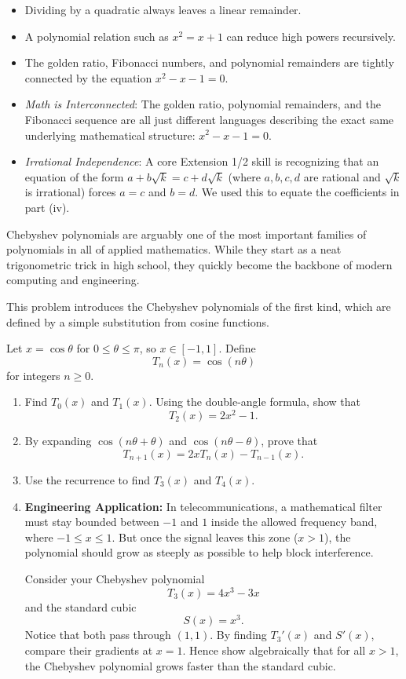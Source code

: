 \begin{takeaways}
\begin{itemize}[leftmargin=*]
\item Dividing by a quadratic always leaves a linear remainder.
\item A polynomial relation such as $x^2=x+1$ can reduce high powers recursively.
\item The golden ratio, Fibonacci numbers, and polynomial remainders are tightly connected by the equation $x^2-x-1=0$.
\item \textit{Math is Interconnected}: The golden ratio, polynomial remainders, and the Fibonacci sequence are all just different languages describing the exact same underlying mathematical structure: $x^2 - x - 1 = 0$.
\item \textit{Irrational Independence}: A core Extension 1/2 skill is recognizing that an equation of the form $a + b\sqrt{k} = c + d\sqrt{k}$ (where $a,b,c,d$ are rational and $\sqrt{k}$ is irrational) forces $a=c$ and $b=d$. We used this to equate the coefficients in part (iv).
\end{itemize}
\end{takeaways}

\begin{problem}

Chebyshev polynomials are arguably one of the most important families of polynomials in all of applied mathematics. While they start as a neat trigonometric trick in high school, they quickly become the backbone of modern computing and engineering.


This problem introduces the Chebyshev polynomials of the first kind, which are defined by a simple substitution from cosine functions.


Let $x=\cos\theta$ for $0\le \theta\le \pi$, so $x\in[-1,1]$. Define
\[
T_n(x)=\cos(n\theta)
\]
for integers $n\ge 0$.

\begin{enumerate}[label=(\roman*)]
\item Find $T_0(x)$ and $T_1(x)$. Using the double-angle formula, show that
\[
T_2(x)=2x^2-1.
\]
\item By expanding $\cos(n\theta+\theta)$ and $\cos(n\theta-\theta)$, prove that
\[
T_{n+1}(x)=2xT_n(x)-T_{n-1}(x).
\]
\item Use the recurrence to find $T_3(x)$ and $T_4(x)$.
\item \textbf{Engineering Application:} In telecommunications, a mathematical filter must stay bounded between $-1$ and $1$ inside the allowed frequency band, where $-1\le x\le 1$. But once the signal leaves this zone ($x>1$), the polynomial should grow as steeply as possible to help block interference.

Consider your Chebyshev polynomial
\[
T_3(x)=4x^3-3x
\]
and the standard cubic
\[
S(x)=x^3.
\]
Notice that both pass through $(1,1)$. By finding $T_3'(x)$ and $S'(x)$, compare their gradients at $x=1$. Hence show algebraically that for all $x>1$, the Chebyshev polynomial grows faster than the standard cubic.
\end{enumerate}
\end{problem}

